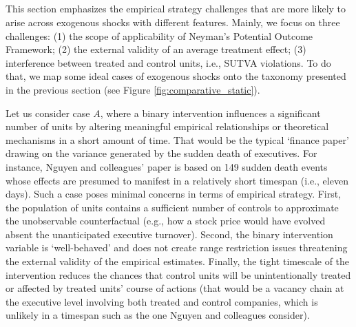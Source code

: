 \documentclass[11pt]{article}
\begin{document}
\begin{refsection}
\section{}
\label{sec:harnessing_exogenous_shocks}

\noindent This section emphasizes the empirical strategy challenges that are
more likely to arise across exogenous shocks with different features. Mainly, we
focus on three challenges: (1) the scope of applicability of Neyman's Potential
Outcome Framework; (2) the external validity of an average treatment effect; (3)
interference between treated and control units, i.e., SUTVA violations. To do
that, we map some ideal cases of exogenous shocks onto the taxonomy presented in
the previous section (see Figure \ref{fig:comparative_static}).

Let us consider case $A$, where a binary intervention influences a significant
number of units by altering meaningful empirical relationships or theoretical
mechanisms in a short amount of time. That would be the typical `finance paper'
drawing on the variance generated by the sudden death of executives. For
instance, Nguyen and colleagues' \autocite*{nguyen_et_al_2014} paper is based on
149 sudden death events whose effects are presumed to manifest in a relatively
short timespan (i.e., eleven days). Such a case poses minimal concerns in terms
of empirical strategy.  First, the population of units contains a sufficient
number of controls to approximate the unobservable counterfactual (e.g., how a
stock price would have evolved absent the unanticipated executive turnover).
Second, the binary intervention variable is `well-behaved' and does not create
range restriction issues threatening the external validity of the empirical
estimates.  Finally, the tight timescale of the intervention reduces the chances
that control units will be unintentionally treated or affected by treated units'
course of actions (that would be a vacancy chain at the executive level
involving both treated and control companies, which is unlikely in a timespan
such as the one Nguyen and colleagues \autocite*{nguyen_et_al_2014} consider). 

\vspace{2em}


\end{refsection}
\end{document}
